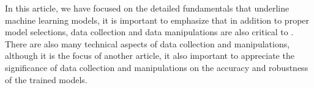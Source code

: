 
\par
In this article, we have focused on the detailed fundamentals that underline machine learning models, it is important to emphasize that in addition to proper model selections, data collection and data manipulations are also critical to . There are also many technical aspects of data collection and manipulations, although it is the focus of another article, it also important to appreciate the significance of data collection and manipulations on the accuracy and robustness of the trained models.
\par 
